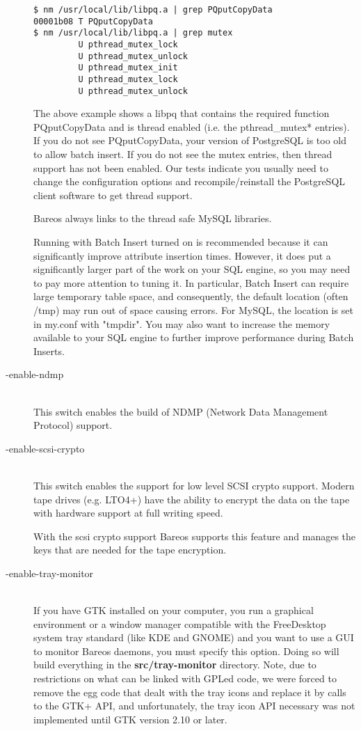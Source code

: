 \begin{description}
\begin{verbatim}
$ nm /usr/local/lib/libpq.a | grep PQputCopyData
00001b08 T PQputCopyData
$ nm /usr/local/lib/libpq.a | grep mutex
         U pthread_mutex_lock
         U pthread_mutex_unlock
         U pthread_mutex_init
         U pthread_mutex_lock
         U pthread_mutex_unlock
\end{verbatim}

The above example shows a libpq that contains the required function
PQputCopyData and is thread enabled (i.e. the pthread\_mutex* entries).
If you do not see PQputCopyData, your version of PostgreSQL is too old
to allow batch insert.  If you do not see the mutex entries, then thread
support has not been enabled. Our tests indicate you usually need to
change the configuration options and recompile/reinstall the PostgreSQL
client software to get thread support.

Bareos always links to the thread safe MySQL libraries.

Running with Batch Insert turned on is recommended because it can
significantly improve attribute insertion times. However, it does
put a significantly larger part of the work on your SQL engine, so
you may need to pay more attention to tuning it. In particular,
Batch Insert can require large temporary table space, and consequently,
the default location (often /tmp) may run out of space causing errors.
For MySQL, the location is set in my.conf with "tmpdir".  You may also
want to increase the memory available to your SQL engine to further
improve performance during Batch Inserts.

\item [ {-}{\-}enable-ndmp] \hfill \\
This switch enables the build of NDMP (Network Data Management Protocol)
support.

\item [ {-}{\-}enable-scsi-crypto] \hfill \\
This switch enables the support for low level SCSI crypto support.
Modern tape drives (e.g. LTO4+) have the ability to encrypt the data
on the tape with hardware support at full writing speed.

With the scsi crypto support Bareos supports this feature and manages
the keys that are needed for the tape encryption.


\item [ {-}{\-}enable-tray-monitor] \hfill \\
If you have GTK installed on your computer, you run a graphical
environment or a window manager compatible with the FreeDesktop system
tray standard (like KDE and GNOME) and you want to use a GUI to monitor
Bareos daemons, you must specify this option.  Doing so will build
everything in the {\bf src/tray-monitor} directory. Note, due to
restrictions on what can be linked with GPLed code, we were forced to
remove the egg code that dealt with the tray icons and replace it by
calls to the GTK+ API, and unfortunately, the tray icon API necessary
was not implemented until GTK version 2.10 or later.


\end{description}
